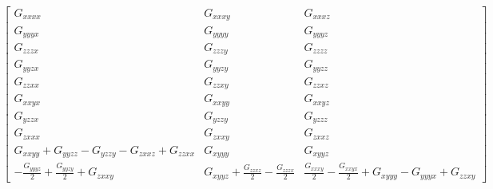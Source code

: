 \documentclass[fleqn,8pt,landscape]{jsarticle}
\begin{document}
\begin{align*}
\begin{bmatrix} G_{xxxx} & G_{xxxy} & G_{xxxz} \\ G_{yyyx} & G_{yyyy} & G_{yyyz} \\ G_{zzzx} & G_{zzzy} & G_{zzzz} \\ G_{yyzx} & G_{yyzy} & G_{yyzz} \\ G_{zzxx} & G_{zzxy} & G_{zzxz} \\ G_{xxyx} & G_{xxyy} & G_{xxyz} \\ G_{yzzx} & G_{yzzy} & G_{yzzz} \\ G_{zxxx} & G_{zxxy} & G_{zxxz} \\ G_{xxyy} + G_{yyzz} - G_{yzzy} - G_{zxxz} + G_{zzxx} & G_{xyyy} & G_{xyyz} \\ - \frac{G_{yyyz}}{2} + \frac{G_{yyzy}}{2} + G_{zxxy} & G_{xyyz} + \frac{G_{zzxz}}{2} - \frac{G_{zzzx}}{2} & \frac{G_{xxxy}}{2} - \frac{G_{xxyx}}{2} + G_{xyyy} - G_{yyyx} + G_{zzxy} \end{bmatrix}
\end{align*}
\end{document}

